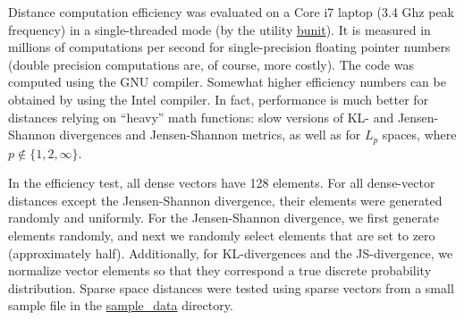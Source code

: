 \documentclass[runningheads,a4paper]{llncs}
\begin{document}
{Distance computation efficiency was evaluated on a Core i7 laptop (3.4 Ghz peak frequency)
in a single-threaded mode (by the utility \href{https://github.com/searchivarius/NonMetricSpaceLib/blob/master/similarity_search/test/bunit.cc}{bunit}).
It is measured in millions of computations per second for single-precision
floating pointer numbers (double precision computations are, of course, more costly). 
The code was computed using the GNU compiler. 
Somewhat higher efficiency numbers can be obtained by using the Intel compiler.
In fact, performance is much better for distances relying on ``heavy'' math functions:
slow versions of KL- and Jensen-Shannon divergences and Jensen-Shannon metrics, 
as well as for $L_p$ spaces,
where $p \not\in\{1,2,\infty\}$.

In the efficiency test, all dense vectors have 128 elements.
For all dense-vector distances except the Jensen-Shannon divergence,
their elements were generated randomly and uniformly.
For the Jensen-Shannon divergence, we first generate elements randomly,
and next we randomly select elements that are set to zero (approximately half). 
Additionally, for KL-divergences and the JS-divergence,
we normalize vector elements so that they correspond a true discrete probability distribution. 
Sparse space distances were tested using sparse vectors from a small sample file in the
\href{https://github.com/searchivarius/NonMetricSpaceLib/blob/master/sample_data/sparse_5K.txt}{sample\_data} directory.

}
\end{document}

